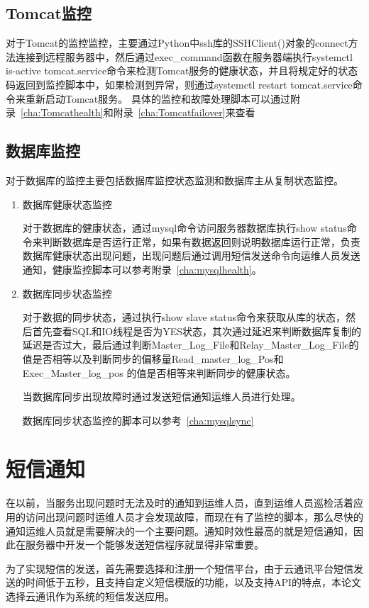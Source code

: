 \subsection{Tomcat监控}
对于Tomcat的监控监控，主要通过Python中ssh库的SSHClient()对象的connect方法连接到远程服务器中，然后通过exec\_command函数在服务器端执行systemctl is-active tomcat.service命令来检测Tomcat服务的健康状态，并且将规定好的状态码返回到监控脚本中，如果检测到异常，则通过systemctl restart tomcat.service命令来重新启动Tomcat服务。
具体的监控和故障处理脚本可以通过附录~\ref{cha:Tomcathealth}和附录~\ref{cha:Tomcatfailover}来查看
\subsection{数据库监控}
对于数据库的监控主要包括数据库监控状态监测和数据库主从复制状态监控。
\begin{enumerate}
\item 数据库健康状态监控

对于数据库的健康状态，通过mysql命令访问服务器数据库执行show status命令来判断数据库是否运行正常，如果有数据返回则说明数据库运行正常，负责数据库健康状态出现问题，出现问题后通过调用短信发送命令向运维人员发送通知，健康监控脚本可以参考附录~\ref{cha:mysqlhealth}。
\item 数据库同步状态监控

对于数据的同步状态，通过执行show slave status命令来获取从库的状态，然后首先查看SQL和IO线程是否为YES状态，其次通过延迟来判断数据库复制的延迟是否过大，最后通过判断Master\_Log\_File和Relay\_Master\_Log\_File的值是否相等以及判断同步的偏移量Read\_master\_log\_Pos和Exec\_Master\_log\_pos 的值是否相等来判断同步的健康状态。

当数据库同步出现故障时通过发送短信通知运维人员进行处理。

数据库同步状态监控的脚本可以参考~\ref{cha:mysqlsync}
\end{enumerate}
\section{短信通知}
在以前，当服务出现问题时无法及时的通知到运维人员，直到运维人员巡检活着应用的访问出现问题时运维人员才会发现故障，而现在有了监控的脚本，那么尽快的通知运维人员就是需要解决的一个主要问题。通知时效性最高的就是短信通知，因此在服务器中开发一个能够发送短信程序就显得非常重要\cite{陈泰伟2007基于短信平台的服务器监控系统关键技术探讨}。

为了实现短信的发送，首先需要选择和注册一个短信平台，由于云通讯平台短信发送的时间低于五秒，且支持自定义短信模版的功能，以及支持API的特点，本论文选择云通讯作为系统的短信发送应用。

